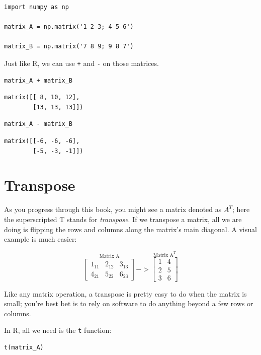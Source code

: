 \documentclass[
  letterpaper,
]{krantz}
\begin{document}
\begin{verbatim}
import numpy as np

matrix_A = np.matrix('1 2 3; 4 5 6')

matrix_B = np.matrix('7 8 9; 9 8 7')
\end{verbatim}

Just like R, we can use \texttt{+} and \texttt{-} on those matrices.

\begin{verbatim}
matrix_A + matrix_B
\end{verbatim}

\begin{verbatim}
matrix([[ 8, 10, 12],
        [13, 13, 13]])
\end{verbatim}

\begin{verbatim}
matrix_A - matrix_B
\end{verbatim}

\begin{verbatim}
matrix([[-6, -6, -6],
        [-5, -3, -1]])
\end{verbatim}

\section{Transpose}\label{transpose}

As you progress through this book, you might see a matrix denoted as
\(A^T\); here the superscripted T stands for \emph{transpose}. If we
transpose a matrix, all we are doing is flipping the rows and columns
along the matrix's main diagonal. A visual example is much easier:

\[
\stackrel{\mbox{Matrix A}}{
\begin{bmatrix}
1_{11} & 2_{12} & 3_{13}\\
4_{21} & 5_{22} & 6_{23}
\end{bmatrix}
}
->
\stackrel{\mbox{Matrix A}^T}{
\begin{bmatrix}
1 & 4 \\
2 & 5 \\
3 & 6
\end{bmatrix}
}
\]

Like any matrix operation, a transpose is pretty easy to do when the
matrix is small; you're best bet is to rely on software to do anything
beyond a few rows or columns.

In R, all we need is the \texttt{t} function:

\begin{verbatim}
t(matrix_A)
\end{verbatim}
\end{document}
